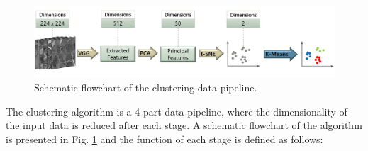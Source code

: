 \documentclass[authoryear,preprint,review,12pt, singleside]{elsarticle}
\begin{document}
\begin{figure}[!h]
	\centering
	\includegraphics[width=\textwidth]{cluster_pipeline_2.jpg}
	\caption{Schematic flowchart of the clustering data pipeline.}
	\label{fig:cluster_pipe}
\end{figure}



The clustering algorithm is a 4-part data pipeline, where the dimensionality of the input data is reduced after each stage. A schematic flowchart of the algorithm is presented in Fig. \ref{fig:cluster_pipe} and the function of each stage is defined as follows:
\end{document}
